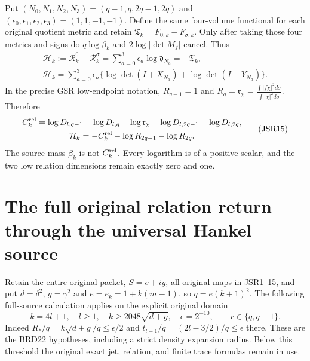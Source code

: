 \documentclass[11pt,a4paper]{article}
\begin{document}
Put $(N_0,N_1,N_2,N_3)=(q-1,q,2q-1,2q)$ and
$(\epsilon_0,\epsilon_1,\epsilon_2,\epsilon_3)=(1,1,-1,-1)$.
Define the same four-volume functional for each original
quotient metric and retain
$\mathfrak T_k=F_{0,k}-F_{\sigma,k}$.
Only after taking those four metrics and signs do
$q\log\beta_k$ and $2\log|\det M_f|$ cancel. Thus
\[
\begin{gathered}
 \mathcal H_k:=\mathcal R_k^0-\mathcal R_k^\sigma
 =\sum_{a=0}^3\epsilon_a\log\mathfrak d_{N_a}
 =-\mathfrak T_k,\\
 \mathcal H_k=\sum_{a=0}^3\epsilon_a
       \{\log\det(I+X_{N_a})+\log\det(I-Y_{N_a})\}.
\end{gathered}\tag{JSR14}
\]
In the precise GSR low-endpoint notation,
$R_{q-1}=1$ and
$R_q=\mathfrak r_\chi=
\frac{\int|f\chi|^2d\sigma}{\int|\chi|^2d\sigma}$.
Therefore
\[
\begin{gathered}
 C_k^{\rm rel}=\log D_{l,q-1}+\log D_{l,q}
   -\log\mathfrak r_\chi-\log D_{l,2q-1}-\log D_{l,2q},\\
 \mathcal H_k=-C_k^{\rm rel}-\log R_{2q-1}-\log R_{2q}.
\end{gathered}\tag{JSR15}
\]
The source mass $\beta_k$ is not $C_k^{\rm rel}$.
Every logarithm is of a positive scalar, and the two low
relation dimensions remain exactly zero and one.

\section{The full original relation return through the universal Hankel source}

Retain the entire original packet, $S=c+iy$, all original maps
in JSR1--15, and put $d=\delta^2$, $g=\gamma^2$ and
$e=e_k=1+k(m-1)$, so $q=e(k+1)^2$. The following full-source
calculation applies on the explicit original domain
\[
 k=4l+1,\quad l\geq1,\quad
 k\geq2048\sqrt{d+g},\quad
 \epsilon=2^{-10},\qquad r\in\{q,q+1\}.
 \tag{BHR1}
\]
Indeed $R_*/q=k\sqrt{d+g}/q\leq\epsilon/2$ and
$t_{l-1}/q=(2l-3/2)/q\leq\epsilon$ there. These are the
BRD22 hypotheses, including a strict density expansion
radius. Below this threshold the original exact jet,
relation, and finite trace formulas remain in use.
\end{document}
